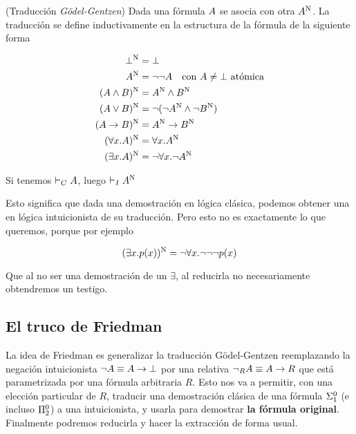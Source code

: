\begin{definition}{(Traducción \textit{Gödel-Gentzen})} Dada una fórmula $A$ se asocia con otra $A^{\text{N}}$. La
    traducción se define inductivamente en la estructura de la fórmula de la
    siguiente forma

    \begin{align*}
        \bot^{\text{N}} &= \bot\\
        A^{\text{N}} &= \neg\neg A \quad \text{con $A \neq \bot$ atómica}\\
        (A \wedge B)^{\text{N}} &= A^{\text{N}} \wedge B^{\text{N}}\\
        (A \vee B)^{\text{N}} &= \neg(\neg A^{\text{N}} \wedge \neg B^{\text{N}})\\
        (A \rightarrow B)^{\text{N}} &= A^{\text{N}} \rightarrow B^{\text{N}}\\
        (\forall x . A)^{\text{N}} &= \forall x . A^{\text{N}}\\
        (\exists x . A)^{\text{N}} &= \neg \forall x . \neg A^{\text{N}}
    \end{align*}
\end{definition}

\begin{theorem}
    Si tenemos $\vdash_C A$, luego $\vdash_I A^{\text{N}}$
\end{theorem}

Esto significa que dada una demostración en lógica clásica, podemos obtener una
en lógica intuicionista de su traducción. Pero esto no es exactamente lo que
queremos, porque por ejemplo

\[
    (\exists x. p(x))^{\text{N}} = \neg \forall x . \neg\neg\neg p(x)
\]

Que al no ser una demostración de un $\exists$, al reducirla no necesariamente
obtendremos un testigo.

\subsection{El truco de Friedman}

La idea de Friedman \cite{miquel-friedman} es generalizar la traducción
Gödel-Gentzen reemplazando la negación intuicionista $\neg A \equiv A
\rightarrow \bot$ por una relativa $\neg_R A \equiv A \rightarrow R$ que
está parametrizada por una fórmula arbitraria $R$. Esto nos va a permitir, con
una elección particular de $R$,
traducir una demostración clásica de una fórmula $\Sigma^0_1$ (e incluso
$\Pi^0_2$) a una intuicionista, y usarla para demostrar \textbf{la fórmula
original}. Finalmente podremos reducirla y hacer la extracción de forma usual.

